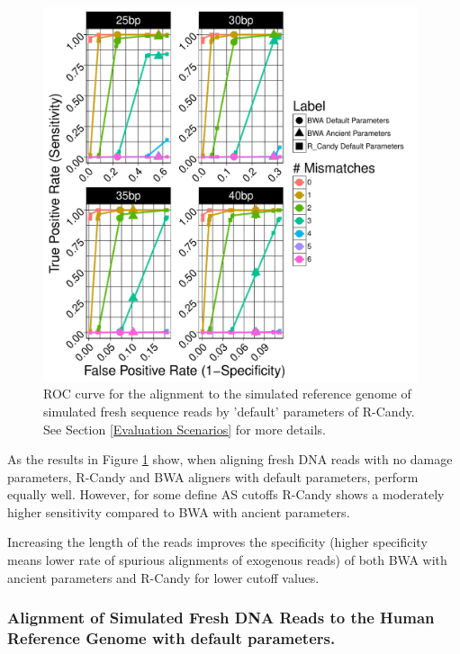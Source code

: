 \documentclass[11pt,a4paper]{report}
\begin{document}
\begin{figure}[H]
\centering
\includegraphics[width=11cm]{pictures/f_DS3_emp.pdf}
\caption{
ROC curve for the alignment to the simulated reference genome of simulated 
fresh sequence reads by 'default' parameters of R-Candy. See Section 
\ref{Evaluation Scenarios} for more details.}
\label{DS3_emp}
\end{figure}


As the results in Figure \ref{DS3_emp} show, when aligning fresh DNA reads with 
no damage parameters, R-Candy and BWA aligners with default parameters, perform
equally well. However, for some define AS cutoffs R-Candy shows a moderately higher 
sensitivity compared to BWA with ancient parameters.

Increasing the length of the reads improves the specificity (higher specificity 
means lower rate of spurious alignments of exogenous reads) of both BWA with 
ancient parameters and R-Candy for lower cutoff values.





\subsubsection{ Alignment of Simulated Fresh DNA Reads to the Human Reference Genome
with default parameters.}

\label{ Alignment of Simulated Fresh DNA Reads to a the Human Reference Genome with
default parameters.}
\end{document}
